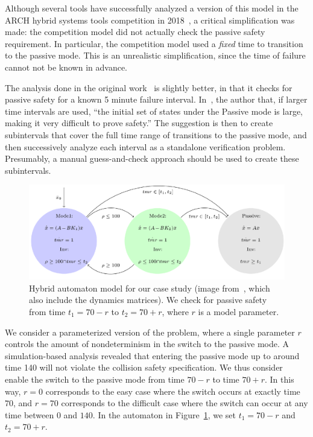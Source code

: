 Although several tools have successfully analyzed a version of this model in the ARCH hybrid systems tools competition in
2018~\cite{archcomp18linear}, a critical simplification was made: the competition model did not actually check the passive safety requirement.
%
In particular, the competition model used a \emph{fixed} time to transition to the passive mode.
%
This is an unrealistic simplification, since the time of failure cannot not be known in advance.


The analysis done in the original work~\cite{chan2017verifying} is slightly better, in that it checks for passive safety for a known 5 minute failure interval.
%
In~\cite{chan2017verifying}, the author that, if larger time intervals are used,
``the initial set of states under the Passive mode is large, making it very difficult to prove safety.''
%
The suggestion is then to create subintervals that cover the full time range of transitions to the passive mode, and then successively
analyze each interval as a standalone verification problem.
%
Presumably, a manual guess-and-check approach should be used to create these subintervals.
%

\begin{figure}[t]
\centerline{\includegraphics[width=0.9\columnwidth]{images/ha.png}}
\caption{Hybrid automaton model for our case study (image from~\cite{chan2017verifying}, which also include the dynamics matrices). We check for passive safety
  from time $t_1=70 - r$ to $t_2=70 + r$, where $r$ is a model parameter.}
\label{fig:ha}
\end{figure}

We consider a parameterized version of the problem, where a single parameter $r$ controls the amount of nondeterminism in the switch to the passive mode.
%
A simulation-based analysis revealed that entering the passive mode up to around time 140 will not violate the collision safety specification.
%
We thus consider enable the switch to the passive mode from time $70-r$ to time $70+r$.
%
In this way, $r=0$ corresponds to the easy case where the switch
occurs at exactly time $70$, and $r=70$ corresponds to the difficult case where the switch can occur at any time between $0$ and $140$.
%
In the automaton in Figure~\ref{fig:ha}, we set $t_1=70 - r$ and $t_2=70 + r$.

